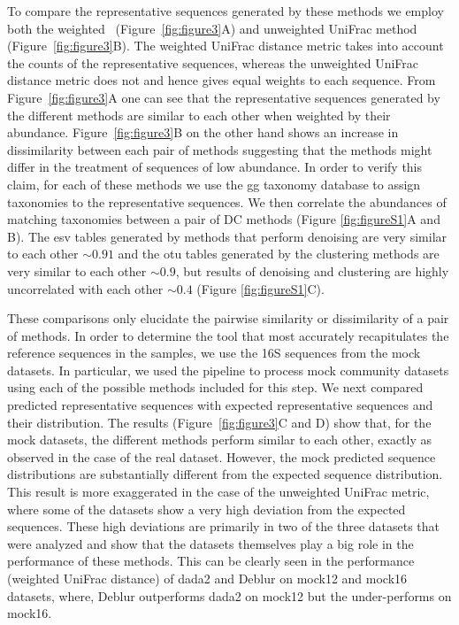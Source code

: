   To compare the representative sequences generated by these methods we employ both the weighted~\cite{Lozupone2007} (Figure~\ref{fig:figure3}A) and unweighted UniFrac method~\cite{Lozupone2005} (Figure~\ref{fig:figure3}B).
  The weighted UniFrac distance metric takes into account the counts of the representative sequences, whereas the unweighted UniFrac distance metric does not and hence gives equal weights to each sequence.
  From Figure~\ref{fig:figure3}A one can see that the representative sequences generated by the different methods are similar to each other when weighted by their abundance.
  Figure~\ref{fig:figure3}B on the other hand shows an increase in dissimilarity between each pair of methods suggesting that the methods might differ in the treatment of sequences of low abundance.
  In order to verify this claim, for each of these methods we use the \ac{gg} taxonomy database to assign taxonomies to the representative sequences.
  We then correlate the abundances of matching taxonomies between a pair of DC methods (Figure \ref{fig:figureS1}A and B).
  The \ac{esv} tables generated by methods that perform denoising are very similar to each other $\sim0.91$ and the \ac{otu} tables generated by the clustering methods are very similar to each other $\sim0.9$, but results of denoising and clustering are highly uncorrelated with each other $\sim0.4$ (Figure \ref{fig:figureS1}C).

  These comparisons only elucidate the pairwise similarity or dissimilarity of a pair of methods.
  In order to determine the tool that most accurately recapitulates the reference sequences in the samples, we use the 16S sequences from the mock datasets.
  In particular, we used the pipeline to process mock community datasets using each of the possible methods included for this step.
  We next compared predicted representative sequences with expected representative sequences and their distribution.
  The results (Figure~\ref{fig:figure3}C and D) show that, for the mock datasets, the different methods perform similar to each other, exactly as observed in the case of the real dataset. However, the mock predicted sequence distributions are substantially different from the expected sequence distribution.
  This result is more exaggerated in the case of the unweighted UniFrac metric, where some of the datasets show a very high deviation from the expected sequences.
  These high deviations are primarily in two of the three datasets that were analyzed and show that the datasets themselves play a big role in the performance of these methods.
  This can be clearly seen in the performance (weighted UniFrac distance) of \ac{dada2} and Deblur on mock12 and mock16 datasets, where, Deblur outperforms \ac{dada2} on mock12 but the under-performs on mock16.

